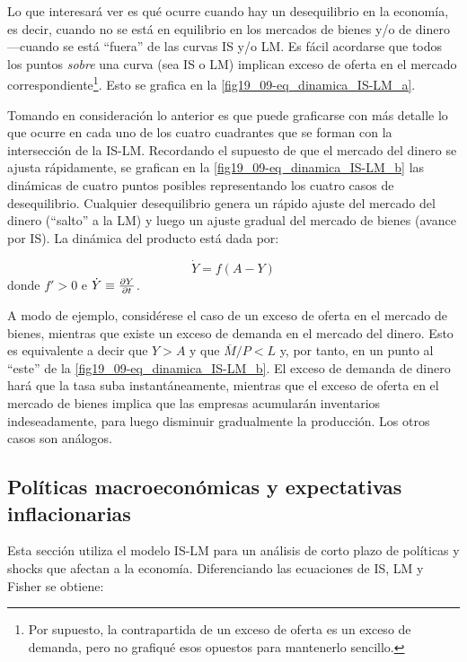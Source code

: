 \documentclass[DeGregorioResumen]{subfiles}
\begin{document}
Lo que interesará ver es qué ocurre cuando hay un desequilibrio en la economía, es decir, cuando no se está en equilibrio en los mercados de bienes y/o de dinero ---cuando se está ``fuera'' de las curvas IS y/o LM. Es fácil acordarse que todos los puntos \emph{sobre} una curva (sea IS o LM) implican exceso de oferta en el mercado correspondiente\footnote{Por supuesto, la contrapartida de un exceso de oferta es un exceso de demanda, pero no grafiqué esos opuestos para mantenerlo sencillo.}. Esto se grafica en la \autoref{fig19_09-eq_dinamica_IS-LM_a}.



Tomando en consideración lo anterior es que puede graficarse con más detalle lo que ocurre en cada uno de los cuatro cuadrantes que se forman con la intersección de la IS-LM. Recordando el supuesto de que el mercado del dinero se ajusta rápidamente, se grafican en la \autoref{fig19_09-eq_dinamica_IS-LM_b} las dinámicas de cuatro puntos posibles representando los cuatro casos de desequilibrio. Cualquier desequilibrio genera un rápido ajuste del mercado del dinero (``salto'' a la LM) y luego un ajuste gradual del mercado de bienes (avance por IS). La dinámica del producto está dada por:

\begin{equation*}
\dot Y = f(A-Y)
\end{equation*}
donde $f'>0$ e $\dot Y \equiv \frac{\partial Y}{\partial t}$.

A modo de ejemplo, considérese el caso de un exceso de oferta en el mercado de bienes, mientras que existe un exceso de demanda en el mercado del dinero. Esto es equivalente a decir que $Y>A$ y que $\overline M/P <L$ y, por tanto, en un punto al ``este'' de la \autoref{fig19_09-eq_dinamica_IS-LM_b}. El exceso de demanda de dinero hará que la tasa suba instantáneamente, mientras que el exceso de oferta en el mercado de bienes implica que las empresas acumularán inventarios indeseadamente, para luego disminuir gradualmente la producción. Los otros casos son análogos.

\subsection{Políticas macroeconómicas y expectativas inflacionarias}

Esta sección utiliza el modelo IS-LM para un análisis de corto plazo de políticas y shocks que afectan a la economía. Diferenciando las ecuaciones de IS, LM y Fisher se obtiene:
\end{document}
